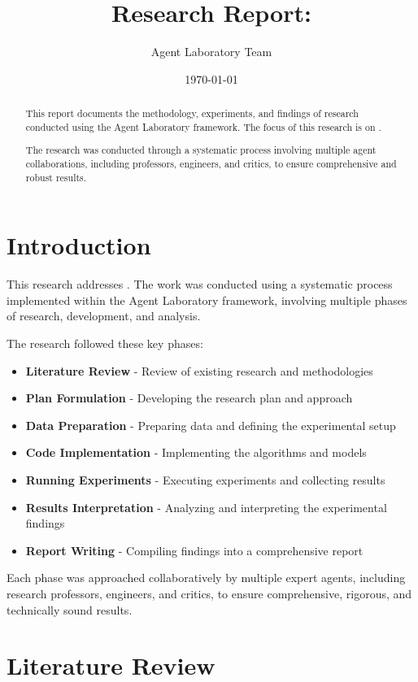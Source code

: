 \documentclass[11pt,a4paper]{article}
\title{\textbf{\Large{Research Report:} \\ \huge{\textsf{}}}}
\author{Agent Laboratory Team}
\date{\today}
\begin{document}
\maketitle

\begin{abstract}
This report documents the methodology, experiments, and findings of research conducted using the Agent Laboratory framework. The focus of this research is on \textbf{}.

The research was conducted through a systematic process involving multiple agent collaborations, including professors, engineers, and critics, to ensure comprehensive and robust results.
\end{abstract}

\tableofcontents
\newpage

\section{Introduction}
This research addresses . The work was conducted using a systematic process implemented within the Agent Laboratory framework, involving multiple phases of research, development, and analysis.

The research followed these key phases:
\begin{itemize}

\item \textbf{Literature Review} - Review of existing research and methodologies
\item \textbf{Plan Formulation} - Developing the research plan and approach
\item \textbf{Data Preparation} - Preparing data and defining the experimental setup
\item \textbf{Code Implementation} - Implementing the algorithms and models
\item \textbf{Running Experiments} - Executing experiments and collecting results
\item \textbf{Results Interpretation} - Analyzing and interpreting the experimental findings
\item \textbf{Report Writing} - Compiling findings into a comprehensive report
\end{itemize}

Each phase was approached collaboratively by multiple expert agents, including research professors, engineers, and critics, to ensure comprehensive, rigorous, and technically sound results.


\section{Literature Review}
\end{document}
